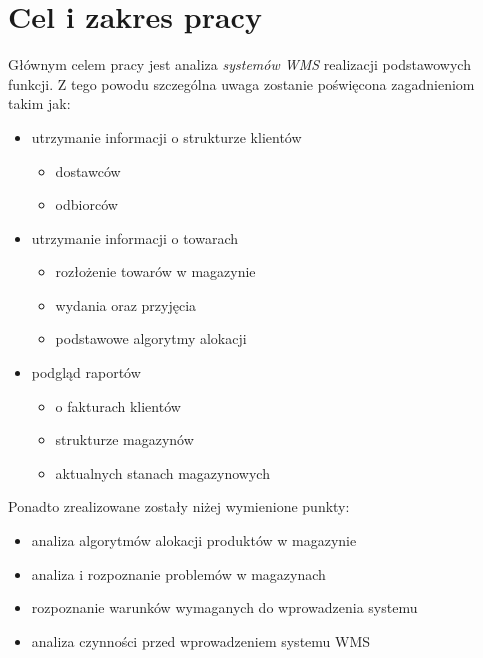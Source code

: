 \section{Cel i zakres pracy}
	Głównym celem pracy jest analiza \emph{systemów WMS} realizacji 
	podstawowych funkcji. Z tego powodu szczególna uwaga zostanie poświęcona zagadnieniom
	takim jak:
	\begin{itemize}
		\item utrzymanie informacji o strukturze klientów
		\begin{itemize}
			\item dostawców
			\item odbiorców
		\end{itemize}
		\item utrzymanie informacji o towarach
		\begin{itemize}
			\item rozłożenie towarów w magazynie
			\item wydania oraz przyjęcia
			\item podstawowe algorytmy alokacji
		\end{itemize}
		\item podgląd raportów
		\begin{itemize}
			\item o fakturach klientów
			\item strukturze magazynów
			\item aktualnych stanach magazynowych
		\end{itemize}
	\end{itemize}
	
	Ponadto zrealizowane zostały niżej wymienione punkty:
	\begin{itemize}
		\item analiza algorytmów alokacji produktów w magazynie
		\item analiza i rozpoznanie problemów w magazynach
		\item rozpoznanie warunków wymaganych do wprowadzenia systemu
		\item analiza czynności przed wprowadzeniem systemu WMS
	\end{itemize}
